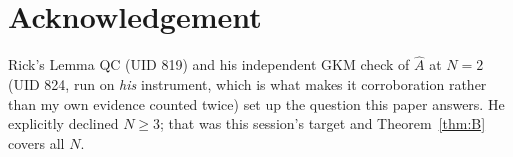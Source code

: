 \documentclass[11pt]{article}
\theoremstyle{plain}
\theoremstyle{definition}
\theoremstyle{remark}
\theoremstyle{plain}
\newcommand{\Ah}{\widehat{A}}
\begin{document}
\section*{Acknowledgement}

Rick's Lemma QC (UID 819) and his independent GKM check of $\Ah$ at $N=2$ (UID
824, run on \emph{his} instrument, which is what makes it corroboration rather
than my own evidence counted twice) set up the question this paper answers.  He
explicitly declined $N\ge3$; that was this session's target and
Theorem~\ref{thm:B} covers all $N$.
\end{document}
